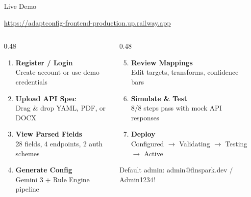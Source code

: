 \documentclass[aspectratio=169,11pt]{beamer}
\begin{document}
\begin{frame}{Live Demo}
\begin{center}
{\large\textcolor{teal}{\url{https://adaptconfig-frontend-production.up.railway.app}}}
\end{center}

\vspace{0.5em}
\begin{columns}[T]
\begin{column}{0.48\textwidth}
\begin{enumerate}
\item \textbf{Register / Login}\\{\small Create account or use demo credentials}
\item \textbf{Upload API Spec}\\{\small Drag \& drop YAML, PDF, or DOCX}
\item \textbf{View Parsed Fields}\\{\small 28 fields, 4 endpoints, 2 auth schemes}
\item \textbf{Generate Config}\\{\small Gemini 3 + Rule Engine pipeline}
\end{enumerate}
\end{column}
\begin{column}{0.48\textwidth}
\begin{enumerate}
\setcounter{enumi}{4}
\item \textbf{Review Mappings}\\{\small Edit targets, transforms, confidence bars}
\item \textbf{Simulate \& Test}\\{\small 8/8 steps pass with mock API responses}
\item \textbf{Deploy}\\{\small Configured $\to$ Validating $\to$ Testing $\to$ Active}
\end{enumerate}
\vspace{0.5em}
{\small\color{ts} Default admin: admin@finspark.dev / Admin1234!}
\end{column}
\end{columns}
\end{frame}
\end{document}
